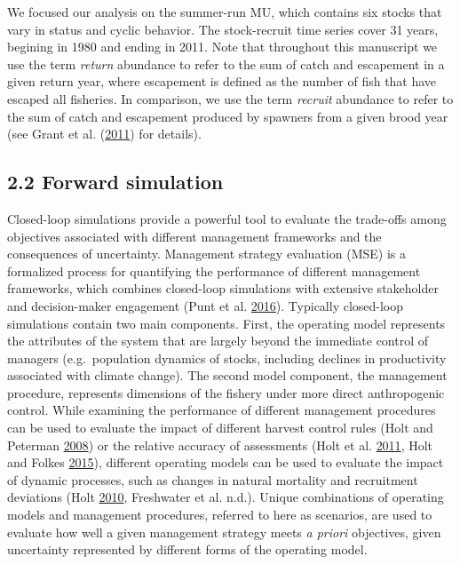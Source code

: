 \documentclass[11pt]{book}
\begin{document}
We focused our analysis on the summer-run MU, which contains six stocks that vary in status and cyclic behavior. The stock-recruit time series cover 31 years, begining in 1980 and ending in 2011. Note that throughout this manuscript we use the term \emph{return} abundance to refer to the sum of catch and escapement in a given return year, where escapement is defined as the number of fish that have escaped all fisheries. In comparison, we use the term \emph{recruit} abundance to refer to the sum of catch and escapement produced by spawners from a given brood year (see Grant et al. (\protect\hyperlink{ref-Grant2011}{2011}) for details).

\subsection{2.2 Forward simulation}\label{forward-simulation}

Closed-loop simulations provide a powerful tool to evaluate the trade-offs among objectives associated with different management frameworks and the consequences of uncertainty. Management strategy evaluation (MSE) is a formalized process for quantifying the performance of different management frameworks, which combines closed-loop simulations with extensive stakeholder and decision-maker engagement (Punt et al. \protect\hyperlink{ref-Punt2016}{2016}). Typically closed-loop simulations contain two main components. First, the operating model represents the attributes of the system that are largely beyond the immediate control of managers (e.g.~population dynamics of stocks, including declines in productivity associated with climate change). The second model component, the management procedure, represents dimensions of the fishery under more direct anthropogenic control. While examining the performance of different management procedures can be used to evaluate the impact of different harvest control rules (Holt and Peterman \protect\hyperlink{ref-Holt2008}{2008}) or the relative accuracy of assessments (Holt et al. \protect\hyperlink{ref-KHolt2011}{2011}, Holt and Folkes \protect\hyperlink{ref-Holt2015}{2015}), different operating models can be used to evaluate the impact of dynamic processes, such as changes in natural mortality and recruitment deviations (Holt \protect\hyperlink{ref-Holt2010}{2010}, Freshwater et al. n.d.). Unique combinations of operating models and management procedures, referred to here as scenarios, are used to evaluate how well a given management strategy meets \emph{a priori} objectives, given uncertainty represented by different forms of the operating model.
\end{document}
